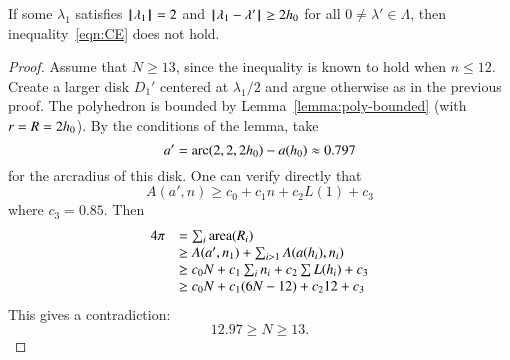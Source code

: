 \begin{lemma}\label{300}\label{lemma:D'}  
If some $\lambda_1$ satisfies ${{\hskip0.1em|\hskip-0.15em|\hskip0.1em}\lambda_1{\hskip0.1em|\hskip-0.15em|\hskip0.1em}}=2$ and
${\hskip0.1em|\hskip-0.15em|\hskip0.1em}\lambda_1 - \lambda'{\hskip0.1em|\hskip-0.15em|\hskip0.1em}\ge 2{h_0}$ for all $0\ne\lambda'\in\Lambda$,
then  inequality~\ref{eqn:CE} does not hold.
\end{lemma}

\begin{proof}  Assume that $N\ge 13$, since the inequality is known to hold when $n\le 12$.   Create a larger disk $D_1'$ centered at $\lambda_1/2$ and argue otherwise as in the previous proof.  The polyhedron is bounded by Lemma~\ref{lemma:poly-bounded} (with $r=R=2{h_0}$).  By the conditions of the lemma, take 
$$a'=\operatorname{arc}(2,2,2{h_0})-a({h_0}) \approx 0.797$$
for the arcradius of this disk.  One can verify directly that~\cite[cc:alin2]{hales:2009:nonlinear} %
$$A(a',n) \ge c_0 + c_1 n + c_2 L(1) + c_3$$
where $c_3 = 0.85$.
Then 
$$
\begin{array}{lll}
4\pi &= \sum_i{\operatorname{area}}(R_i)\\
     &\ge A(a',n_1)+\sum_{i>1} A(a(h_i),n_i) \\
     &\ge  c_0 N +c_1\sum_i n_i + c_2 \sum L(h_i) + c_3\\
     &\ge c_0 N +c_1 (6N-12) + c_2 12 + c_3\\
\end{array}
$$
This gives a contradiction:
$$
12.97 \ge N \ge 13.
$$
\end{proof}
